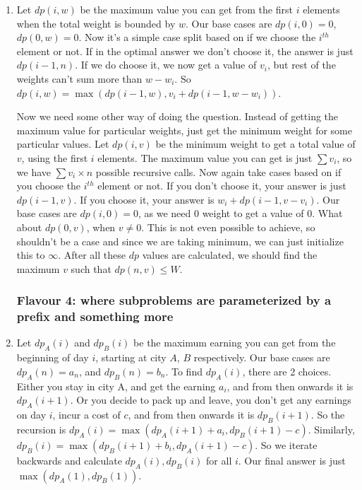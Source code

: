 \documentclass[12pt]{report}
\begin{document}
\begin{enumerate}[label=\textbf{\arabic*.}]
  \item Let $dp(i, w)$ be the maximum value you can get from the first $i$ elements when the total weight is bounded by $w$. Our base cases are $dp(i, 0) = 0$, $dp(0, w) = 0$. Now it's a simple case split based
  on if we choose the $i^{th}$ element or not. If in the optimal answer we don't choose it, the answer is just $dp(i-1, n)$. If we do choose it, we now get a value of $v_i$, but rest of the weights can't sum more
  than $w - w_i$. So $dp(i,w) = \max(dp(i-1,w), v_i + dp(i-1, w - w_i))$.

  Now we need some other way of doing the question. Instead of getting the maximum value for particular weights, just get the minimum weight for some particular values. Let $dp(i, v)$ be the minimum weight to get a
  total value of $v$, using the first $i$ elements. The maximum value you can get is just $\sum v_i$, so we have $\sum v_i \times n$ possible recursive calls. Now again take cases based on if you choose the $i^{th}$ 
  element or not. If you don't choose it, your answer is just $dp(i-1, v)$. If you choose it, your answer is $w_i + dp(i-1, v - v_i)$. Our base cases are $dp(i,0) = 0$, as we need 0 weight to get a value of $0$. What
  about $dp(0,v)$, when $v \neq 0$. This is not even possible to achieve, so shouldn't be a case and since we are taking minimum, we can just initialize this to $\infty$. After all these $dp$ values are calculated,
  we should find the maximum $v$ such that $dp(n,v) \leq W$.

  \subsubsection*{Flavour 4: where subproblems are parameterized by a preﬁx and something more}

  \item Let $dp_A(i)$ and $dp_B(i)$ be the maximum earning you can get from the beginning of day $i$, starting at city $A$, $B$ respectively. Our base cases are $dp_A(n) = a_n$, and $dp_B(n) = b_n$. To find $dp_A(i)$,
  there are 2 choices. Either you stay in city A, and get the earning $a_i$, and from then onwards it is $dp_A(i+1)$. Or you decide to pack up and leave, you don't get any earnings on day $i$, incur a cost of $c$, and
  from then onwards it is $dp_B(i+1)$. So the recursion is $dp_A(i) = \max(dp_A(i+1) + a_i, dp_B(i+1) - c)$. Similarly, $dp_B(i) = \max(dp_B(i+1) + b_i, dp_A(i+1) - c)$. So we iterate backwards and calculate $dp_A(i),
  dp_B(i)$ for all $i$. Our final answer is just $\max(dp_A(1), dp_B(1))$.


\end{enumerate}
\end{document}
